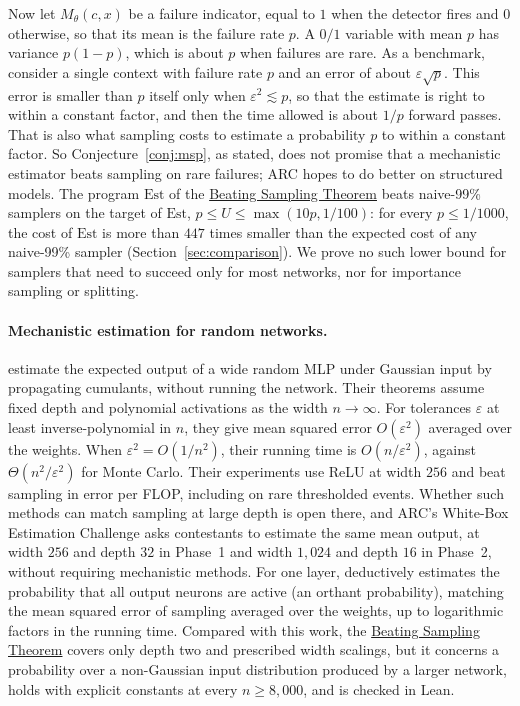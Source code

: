 \documentclass[10pt]{article}
\newcommand{\bst}{\hyperref[thm:main]{Beating Sampling Theorem}}
\newcommand{\Est}{\mathrm{Est}}
\begin{document}
Now let $M_\theta(c,x)$ be a failure indicator, equal to $1$ when the
detector fires and $0$ otherwise, so that its mean is the failure rate $p$.
A $0/1$ variable with mean $p$ has variance $p(1-p)$, which is about $p$ when
failures are rare. As a benchmark, consider a single context with failure
rate $p$ and an error of about $\varepsilon\sqrt p$. This error is smaller
than $p$ itself only when $\varepsilon^2\lesssim p$, so that the estimate is
right to within a constant factor, and then the time allowed is about $1/p$
forward passes. That is also what sampling costs to estimate a probability
$p$ to within a constant factor. So Conjecture~\ref{conj:msp}, as stated, does not
promise that a mechanistic estimator beats sampling on rare failures; ARC
hopes to do better on structured models. The program $\Est$ of the \bst{} beats
naive-99\% samplers on the target of $\Est$, $p\le U\le\max(10p,1/100)$: for every
$p\le1/1000$, the cost of $\Est$ is more than $447$ times smaller than the expected cost
of any naive-99\% sampler (Section~\ref{sec:comparison}). We prove no such lower bound for samplers that
need to succeed only for most networks, nor for importance sampling or
splitting.

\paragraph{Mechanistic estimation for random networks.}
\citet{arc-2026-wide-mlps}
estimate the expected output of a wide random MLP under Gaussian input by
propagating cumulants, without running the network. Their theorems
assume fixed depth and polynomial activations as the width $n\to\infty$. For
tolerances $\varepsilon$ at least inverse-polynomial in $n$, they give mean
squared error $O(\varepsilon^2)$ averaged over the weights. When
$\varepsilon^2=O(1/n^2)$, their running time is $O(n/\varepsilon^2)$, against
$\Theta(n^2/\varepsilon^2)$ for Monte Carlo. Their experiments use ReLU at
width $256$ and beat sampling in error per FLOP, including on rare thresholded events. Whether such methods can match sampling
at large depth is open there, and ARC's White-Box Estimation
Challenge \citep{arc-2026-challenge,aicrowd-2026-phase2} asks contestants to estimate the same mean output, at width $256$ and depth
$32$ in Phase~1 and width $1{,}024$ and depth $16$ in Phase~2, without
requiring mechanistic methods. For one layer, \citet{hilton-2025-halfspaces} deductively
estimates the probability that all output neurons are active (an orthant
probability), matching the mean squared error of sampling averaged over the
weights, up to logarithmic factors in the running time. Compared with this
work, the \bst{} covers only depth two and prescribed width scalings,
but it concerns a probability over a non-Gaussian input distribution produced
by a larger network, holds with explicit constants at every $n\ge8{,}000$,
and is checked in Lean.
\end{document}
